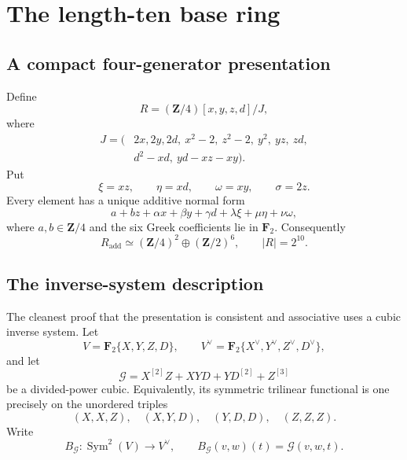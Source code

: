 \documentclass[11pt]{article}
\theoremstyle{remark}
\newcommand{\F}{\mathbf F}
\newcommand{\Z}{\mathbf Z}
\begin{document}
\section{The length-ten base ring}\label{sec:base}

\subsection{A compact four-generator presentation}

Define
\begin{equation}\label{eq:R-presentation}
R=(\Z/4)[x,y,z,d]/J,
\end{equation}
where
\begin{equation}\label{eq:J}
\begin{split}
J=\bigl(&2x,2y,2d,\ x^2-2,\ z^2-2,\ y^2,\ yz,\ zd,\\
        &d^2-xd,\ yd-xz-xy\bigr).
\end{split}
\end{equation}
Put
\begin{equation}\label{eq:secondary-names}
 \xi=xz,\qquad \eta=xd,\qquad \omega=xy,
 \qquad \sigma=2z.
\end{equation}
Every element has a unique additive normal form
\begin{equation}\label{eq:additive-normal-form}
 a+bz+\alpha x+\beta y+\gamma d
       +\lambda\xi+\mu\eta+\nu\omega,
\end{equation}
where \(a,b\in\Z/4\) and the six Greek coefficients lie in \(\F_2\).
Consequently
\begin{equation}\label{eq:additive-type}
 R_{\mathrm{add}}\simeq(\Z/4)^2\oplus(\Z/2)^6,
 \qquad |R|=2^{10}.
\end{equation}

\subsection{The inverse-system description}

The cleanest proof that the presentation is consistent and associative uses
a cubic inverse system.  Let
\[
 V=\F_2\{X,Y,Z,D\},\qquad V^\vee=\F_2\{X^\vee,Y^\vee,Z^\vee,D^\vee\},
\]
and let
\begin{equation}\label{eq:cubic}
 \mathcal G=X^{[2]}Z+XYD+YD^{[2]}+Z^{[3]}
\end{equation}
be a divided-power cubic.  Equivalently, its symmetric trilinear functional
is one precisely on the unordered triples
\[
 (X,X,Z),\quad(X,Y,D),\quad(Y,D,D),\quad(Z,Z,Z).
\]
Write
\[
 B_{\mathcal G}:\operatorname{Sym}^2(V)\longrightarrow V^\vee,
 \qquad B_{\mathcal G}(v,w)(t)=\mathcal G(v,w,t).
\]
\end{document}
